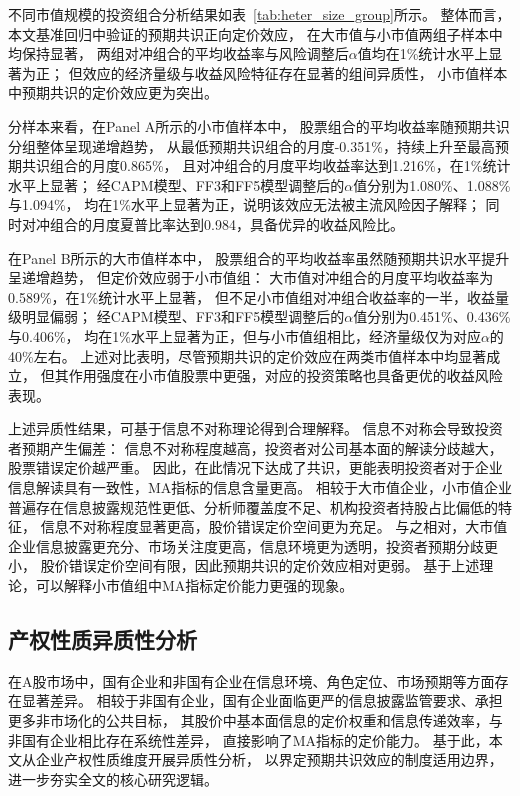  \FloatBarrier

不同市值规模的投资组合分析结果如表~\ref{tab:heter_size_group}所示。
整体而言，本文基准回归中验证的预期共识正向定价效应，
在大市值与小市值两组子样本中均保持显著，
两组对冲组合的平均收益率与风险调整后$\alpha$值均在1\%统计水平上显著为正；
但效应的经济量级与收益风险特征存在显著的组间异质性，
小市值样本中预期共识的定价效应更为突出。

分样本来看，在Panel A所示的小市值样本中，
股票组合的平均收益率随预期共识分组整体呈现递增趋势，
从最低预期共识组合的月度-0.351\%，持续上升至最高预期共识组合的月度0.865\%，
且对冲组合的月度平均收益率达到1.216\%，在1\%统计水平上显著；
经CAPM模型、FF3和FF5模型调整后的$\alpha$值分别为1.080\%、1.088\%与1.094\%，
均在1\%水平上显著为正，说明该效应无法被主流风险因子解释；
同时对冲组合的月度夏普比率达到0.984，具备优异的收益风险比。

在Panel B所示的大市值样本中，
股票组合的平均收益率虽然随预期共识水平提升呈递增趋势，
但定价效应弱于小市值组：
大市值对冲组合的月度平均收益率为0.589\%，在1\%统计水平上显著，
但不足小市值组对冲组合收益率的一半，收益量级明显偏弱；
经CAPM模型、FF3和FF5模型调整后的$\alpha$值分别为0.451\%、0.436\%与0.406\%，
均在1\%水平上显著为正，但与小市值组相比，经济量级仅为对应$\alpha$的40\%左右。
上述对比表明，尽管预期共识的定价效应在两类市值样本中均显著成立，
但其作用强度在小市值股票中更强，对应的投资策略也具备更优的收益风险表现。

上述异质性结果，可基于信息不对称理论得到合理解释。
信息不对称会导致投资者预期产生偏差\cite{hong2007disagreement}\cite{boehme2006short}：
信息不对称程度越高，投资者对公司基本面的解读分歧越大，股票错误定价越严重。
因此，在此情况下达成了共识，更能表明投资者对于企业信息解读具有一致性，MA指标的信息含量更高。
相较于大市值企业，小市值企业普遍存在信息披露规范性更低、分析师覆盖度不足、机构投资者持股占比偏低的特征，
信息不对称程度显著更高，股价错误定价空间更为充足。
与之相对，大市值企业信息披露更充分、市场关注度更高，信息环境更为透明，投资者预期分歧更小，
股价错误定价空间有限，因此预期共识的定价效应相对更弱。
基于上述理论，可以解释小市值组中MA指标定价能力更强的现象。


\subsection{产权性质异质性分析}

在A股市场中，国有企业和非国有企业在信息环境、角色定位、市场预期等方面存在显著差异。
相较于非国有企业，国有企业面临更严的信息披露监管要求、承担更多非市场化的公共目标，
其股价中基本面信息的定价权重和信息传递效率，与非国有企业相比存在系统性差异，
直接影响了MA指标的定价能力。
基于此，本文从企业产权性质维度开展异质性分析，
以界定预期共识效应的制度适用边界，进一步夯实全文的核心研究逻辑。

